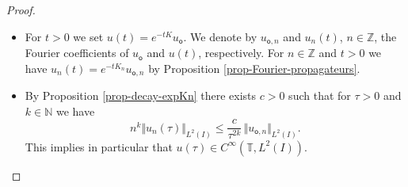 \documentclass[10pt]{amsart}
\theoremstyle{plain}
\theoremstyle{definition}
\newcommand{\nr}[1]{\Vert #1\Vert}
\newcommand{\1}{\mathds 1}
\newcommand{\N}{\mathbb{N}}
\newcommand{\Z}{\mathbb{Z}}
\newcommand{\T}{\mathbb{T}}
\newcommand{\uo}{u_{\mathsf{o}}}
\newcommand{\uon}{u_{\mathsf{o},n}}
\begin{document}
\skpt
\begin{proof}
\begin{itemize}
\item
For $t > 0$ we set $u(t) = e^{-tK} \uo$. We denote by $\uon$ and $u_n(t)$, $n \in \Z$, the Fourier coefficients of $\uo$ and $u(t)$, respectively. For $n \in \Z$ and $t > 0$ we have $u_n(t) = e^{-t K_n} \uon$ by Proposition \ref{prop-Fourier-propagateurs}.

\item
By Proposition \ref{prop-decay-expKn} there exists $c > 0$ such that for $\tau > 0$ and $k \in \N$ we have
\begin{equation} \label{eq-estim-nk-un}
n^k \nr{u_n(\tau)}_{L^2(I)} \leq \frac c {\tau^{2k}}\, \nr{\uon}_{L^2(I)}.
\end{equation}
This implies in particular that $u(\tau) \in C^\infty(\T,L^2(I))$.


\end{itemize}
\end{proof}
\end{document}
